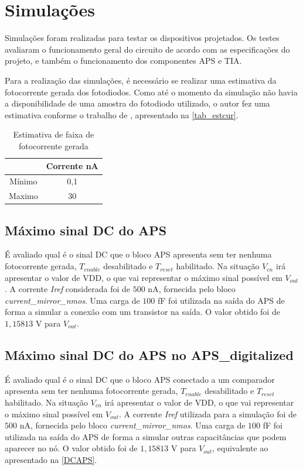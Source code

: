 \section{Simulações}

Simulações foram realizadas para testar os dispositivos projetados. Os testes avaliaram o funcionamento geral do circuito de acordo com as especificações do projeto, e também o funcionamento dos componentes APS e TIA.

Para a realização das simulações, é necessário se realizar uma estimativa da fotocorrente gerada dos fotodiodos. Como até o momento da simulação não havia a disponibilidade de uma amostra do fotodiodo utilizado, o autor fez uma estimativa conforme o trabalho de \cite{LidianeCampos}, apresentado na \autoref{tab_estcur}.

\begin{table}[htbp]
\caption{Estimativa de faixa de fotocorrente gerada}
\label{tab_estcur}
\centering
\begin{tabular}{cc}
\toprule
& Corrente nA \\
\midrule \midrule
Mínimo & 0,1\\
\midrule
Maximo & 30\\
\bottomrule
\end{tabular}
\end{table}

\subsection{Máximo sinal DC do APS}
\label{DCAPS}

É avaliado qual é o sinal DC que o bloco APS apresenta sem ter nenhuma fotocorrente gerada, $T_{enable}$ desabilitado e $T_{reset}$ habilitado. Na situação $V_{cn}$ irá apresentar o valor de VDD, o que vai representar o máximo sinal possível em $V_{out}$. A corrente \textit{Iref} considerada foi de $500$ nA, fornecida pelo bloco \textit{current\_mirror\_nmos}. Uma carga de $100$ fF foi utilizada na saída do APS de forma a simular a conexão com  um transistor na saída. O valor obtido foi de $1,15813$ V para $V_{out}$.

\subsection{Máximo sinal DC do APS no APS\_digitalized}

É avaliado qual é o sinal DC que o bloco APS conectado a um comparador apresenta sem ter nenhuma fotocorrente gerada, $T_{enable}$ desabilitado e $T_{reset}$ habilitado. Na situação $V_{cn}$ irá apresentar o valor de VDD, o que vai representar o máximo sinal possível em $V_{out}$. A corrente \textit{Iref} utilizada para a simulação foi de $500$ nA, fornecida pelo bloco \textit{current\_mirror\_nmos}. Uma carga de $100$ fF foi utilizada na saída do APS de forma a simular outras capacitâncias que podem aparecer no nó. O valor obtido foi de $1,15813$ V para $V_{out}$, equivalente ao apresentado na \autoref{DCAPS}.

